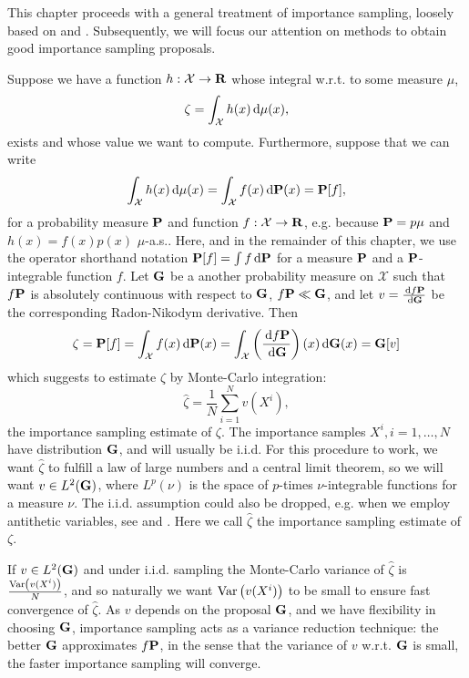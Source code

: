 This chapter proceeds with a general treatment of importance sampling, loosely based on \citep[Chapter 8]{Chopin2020Introduction} and \citep[Chapter 11]{Durbin2012Time}. Subsequently, we will focus our attention on methods to obtain good importance sampling proposals. 

Suppose we have a function $h: \mathcal X \to \R$ whose integral w.r.t. to some measure $\mu$, $$\zeta = \int_{\mathcal X} h(x) \d\mu(x),$$ exists and whose value we want to compute. 
Furthermore, suppose that we can write
$$
    \int_{\mathcal X} h(x) \d \mu(x) = \int_{\mathcal X} f(x) \d \P(x) = \P [f],
$$
for a probability measure $\P$ and function $f: \mathcal X \to \R$, e.g. because $\P = p \mu$ and $h(x) = f(x) p(x)$ $\mu$-a.s.. Here, and in the remainder of this chapter, we use the operator shorthand notation $\P [f] = \int f \d\P$ for a measure $\P$ and a $\P$-integrable function $f$.
Let $\G$ be a another probability measure on $\mathcal X$ such that $f\P$ is absolutely continuous with respect to $\G$, $f\P \ll \G$, and let $v = \frac{\d f\P}{\d\G}$ be the corresponding Radon-Nikodym derivative. Then
$$
    \zeta = \P [f] = \int_{\mathcal X} f(x) \d \P(x) = \int_{\mathcal X} \left(\rnd{f\P}{\G}\right)(x)\d\G(x) = \G [v]
$$
which suggests to estimate $\zeta$ by Monte-Carlo integration: $$\hat \zeta = \frac 1 N \sum_{i=1}^{N} v(X^{i}), $$ the importance sampling estimate of $\zeta$. The importance samples $X^{i}, i = 1, \dots, N$ have distribution $\G$, and will usually be i.i.d. For this procedure to work, we want $\hat \zeta$ to fulfill a law of large numbers and a central limit theorem, so we will want $v \in L^{2}(\G)$, where $L^{p}(\nu)$ is the space of $p$-times $\nu$-integrable functions for a measure $\nu$. The i.i.d. assumption could also be dropped, e.g. when we employ antithetic variables, see \citep[Section 5.3]{Ripley2009Stochastic} and . Here we call $\hat \zeta$ the importance sampling estimate of $\zeta$. 

If $v \in L^{2}(\G)$ and under i.i.d. sampling the Monte-Carlo variance of $\hat \zeta$ is $\frac{\var \left(v(X^{i})\right)}{N}$, and so naturally we want $\var \left(v(X^{i})\right)$ to be small to ensure fast convergence of $\hat \zeta$. As $v$ depends on the proposal $\G$, and we have flexibility in choosing $\G$, importance sampling acts as a variance reduction technique: the better $\G$ approximates $f\P$, in the sense that the variance of $v$ w.r.t. $\G$ is small, the faster importance sampling will converge. 

